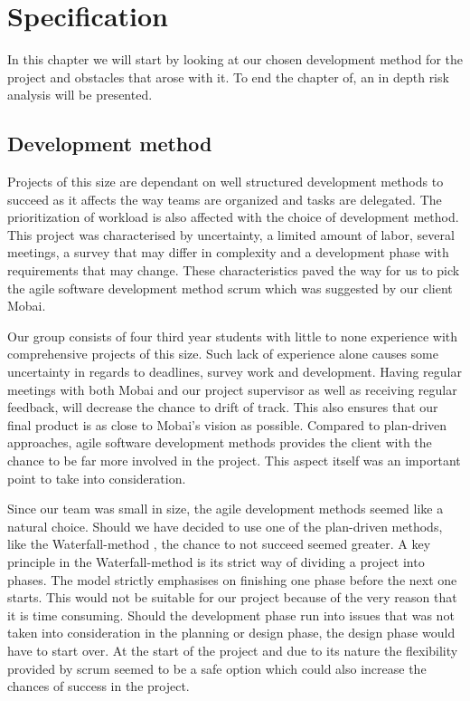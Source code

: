 \chapter{Specification}
\label{chap:Specification}
In this chapter we will start by looking at our chosen development method for the project and obstacles that arose with it. To end the chapter of, an in depth risk analysis will be presented.

\section{Development method}
Projects of this size are dependant on well structured development methods to succeed as it affects the way teams are organized and tasks are delegated. The prioritization of workload is also affected with the choice of development method. 
This project was characterised by uncertainty, a limited amount of labor, several meetings, a survey that may differ in complexity and a development phase with requirements that may change. These characteristics paved the way for us to pick the agile software development method scrum which was suggested by our client Mobai. 

Our group consists of four third year students with little to none experience with comprehensive projects of this size. Such lack of experience alone causes some uncertainty in regards to deadlines, survey work and development. Having regular meetings with both Mobai and our project supervisor as well as receiving regular feedback, will decrease the chance to drift of track. This also ensures that our final product is as close to Mobai's vision as possible. Compared to plan-driven approaches, agile software development methods provides the client with the chance to be far more involved in the project. This aspect itself was an important point to take into consideration.

Since our team was small in size, the agile development methods seemed like a natural choice. Should we have decided to use one of the plan-driven methods, like the Waterfall-method \cite{WaterfallMethod}, the chance to not succeed seemed greater. A key principle in the Waterfall-method is its strict way of dividing a project into phases. The model strictly emphasises on finishing one phase before the next one starts. This would not be suitable for our project because of the very reason that it is time consuming. Should the development phase run into issues that was not taken into consideration in the planning or design phase, the design phase would have to start over. At the start of the project and due to its nature the flexibility provided by scrum seemed to be a safe option which could also increase the chances of success in the project.

